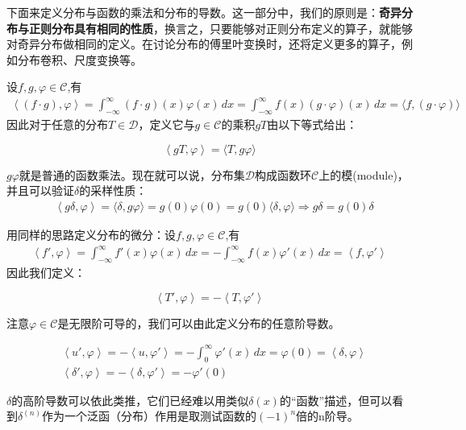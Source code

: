 下面来定义分布与函数的乘法和分布的导数。这一部分中，我们的原则是：\textbf{奇异分布与正则分布具有相同的性质}，换言之，只要能够对正则分布定义的算子，就能够对奇异分布做相同的定义。在讨论分布的傅里叶变换时，还将定义更多的算子，例如分布卷积、尺度变换等。

设$f,g,\varphi\in\mathcal{C} $,有
\begin{align*}
    \left\langle (f\cdot g),\varphi\right\rangle=\int_{-\infty}^{\infty}(f\cdot g)(x)\varphi(x)\,dx=\int_{-\infty}^{\infty}f(x)(g\cdot\varphi)(x)\,dx=\langle f,(g\cdot\varphi)\rangle
\end{align*}
因此对于任意的分布$T\in\mathcal{D} $，定义它与$g\in\mathcal{C} $的乘积$gT$由以下等式给出：
\begin{definition}[分布与函数的乘法]
    \begin{equation*}
    \left\langle gT,\varphi\right\rangle=\langle T,g\varphi\rangle
\end{equation*}
\end{definition}
$g\varphi$就是普通的函数乘法。现在就可以说，分布集$\mathcal{D} $构成函数环$\mathcal{C} $上的模(module)，并且可以验证$\delta$的采样性质：
\begin{align*}
     & \left\langle g\delta,\varphi\right\rangle=\langle \delta,g\varphi\rangle=g(0)\varphi(0)=g(0)\langle\delta,\varphi\rangle \Rightarrow  g\delta=g(0)\delta
\end{align*}

用同样的思路定义分布的微分：设$f,g,\varphi\in\mathcal{C} $,有
\begin{align*}
    \left\langle f',\varphi\right\rangle=\int_{-\infty}^{\infty}f'(x)\varphi(x)\,dx=-\int_{-\infty}^{\infty}f(x)\varphi'(x)\,dx=\left\langle f,\varphi'\right\rangle
\end{align*}
因此我们定义：
\begin{definition}[分布的微分]
    \begin{equation*}
    \left\langle T',\varphi\right\rangle=-\left\langle T,\varphi'\right\rangle
\end{equation*}
\end{definition}
注意$\varphi\in\mathcal{C} $是无限阶可导的，我们可以由此定义分布的任意阶导数。
\begin{example}\label{exmp:delta'}
\begin{align*}
     & \left\langle u',\varphi\right\rangle=-\left\langle u,\varphi'\right\rangle=-\int_{0}^{\infty}\varphi'(x)\,dx=\varphi(0)=\left\langle\delta,\varphi\right\rangle \\
     & \left\langle \delta',\varphi\right\rangle=-\left\langle \delta,\varphi'\right\rangle=-\varphi'(0)
\end{align*}
\end{example}
$\delta$的高阶导数可以依此类推，它们已经难以用类似$\delta(x)$的“函数”描述，但可以看到$\delta^{(n)}$作为一个泛函（分布）作用是取测试函数的$(-1)^n$倍的n阶导。


